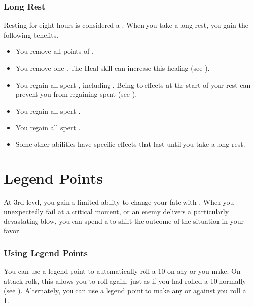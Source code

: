         \subsubsection{Long Rest}\label{Long Rest}
            Resting for eight hours is considered a .
            When you take a long rest, you gain the following benefits.
            \begin{itemize}
                \item You remove all points of .
                \item You remove one .
                    The Heal skill can increase this healing (see ).
                \item You regain all spent , including .
                    Being  to effects at the start of your rest can prevent you from regaining spent  (see ).
                \item You regain all spent .
                \item You regain all spent .
                \item Some other abilities have specific effects that last until you take a long rest.
            \end{itemize}

\section{Legend Points}\label{Legend Points}
    At 3rd level, you gain a limited ability to change your fate with .
    When you unexpectedly fail at a critical moment, or an enemy delivers a particularly devastating blow, you can spend a  to shift the outcome of the situation in your favor.

    \subsubsection{Using Legend Points}
        You can use a legend point to automatically roll a 10 on any  or  you make.
        On attack rolls, this allows you to roll again, just as if you had rolled a 10 normally (see ).
        Alternately, you can use a legend point to make any  or  against you roll a 1.

